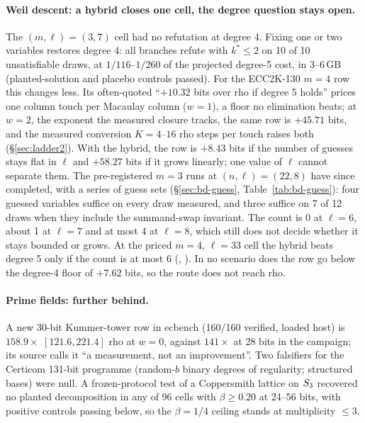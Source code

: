 \paragraph{Weil descent: a hybrid closes one cell, the degree question
stays open.} The $(m,\ell)=(3,7)$ cell had no refutation at degree 4. Fixing
one or two variables restores degree 4: all branches refute with $k^*\le2$ on
10 of 10 unsatisfiable draws, at $1/116$--$1/260$ of the projected degree-5
cost, in 3--6\,GB (planted-solution and placebo controls passed). For the
ECC2K-130 $m=4$ row this changes less. Its often-quoted ``$+10.32$ bits over
rho if degree 5 holds'' prices one column touch per Macaulay column ($w=1$),
a floor no elimination beats; at $w=2$, the exponent the measured closure
tracks, the same row is $+45.71$ bits, and the measured conversion
$K=4$--$16$ rho steps per touch raises both (\S\ref{sec:ladder2}). With the
hybrid, the row is $+8.43$ bits if the number of guesses stays flat in $\ell$
and $+58.27$ bits if it grows linearly; one value of $\ell$ cannot separate
them. The pre-registered $m=3$ runs at $(n,\ell)=(22,8)$ have since
completed, with a series of guess sets (\S\ref{sec:bd-guess},
Table~\ref{tab:bd-guess}): four guessed variables suffice on every draw
measured, and three suffice on 7 of 12 draws when they include the
summand-swap invariant. The count is 0 at $\ell=6$, about 1 at $\ell=7$ and
at most 4 at $\ell=8$, which still does not decide whether it stays bounded
or grows. At the priced
$m=4$, $\ell=33$ cell the hybrid beats degree 5 only if the count is at most
6 (,
). In no scenario does
the row go below the degree-4 floor of $+7.62$ bits, so the route does not
reach rho.

\paragraph{Prime fields: further behind.} A new 30-bit Kummer-tower row in
ecbench (160/160 verified, loaded host) is $158.9\times$ $[121.6,221.4]$ rho at
$w=0$, against $141\times$ at 28 bits in the campaign; its source calls it ``a
measurement, not an improvement''. Two falsifiers for the Certicom 131-bit
programme (random-$b$ binary degrees of regularity; structured bases) were
null. A frozen-protocol test of a Coppersmith lattice on $S_{3}$ recovered no
planted decomposition in any of 96 cells with $\beta\ge0.20$ at 24--56 bits,
with positive controls passing below, so the $\beta=1/4$ ceiling stands at
multiplicity $\le3$.

